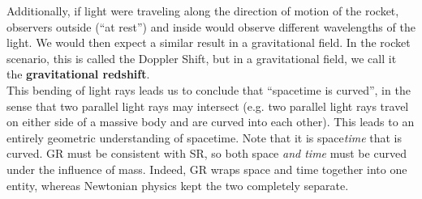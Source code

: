 \documentclass[10pt]{article}
\newcommand{\n}{\noindent}
\begin{document}
	\n Additionally, if light were traveling along the direction of motion of the rocket, observers outside (``at rest'') and inside would observe different wavelengths of the light. We would then expect a similar result in a gravitational field. In the rocket scenario, this is called the Doppler Shift, but in a gravitational field, we call it the \textbf{gravitational redshift}.\\
	
	\n This bending of light rays leads us to conclude that ``spacetime is curved'', in the sense that two parallel light rays may intersect (e.g. two parallel light rays travel on either side of a massive body and are curved into each other). This leads to an entirely geometric understanding of spacetime. Note that it is space\emph{time} that is curved. GR must be consistent with SR, so both space \emph{and time} must be curved under the influence of mass.                                                                                                                             Indeed, GR wraps space and time together into one entity, whereas Newtonian physics kept the two completely separate.
\end{document}
